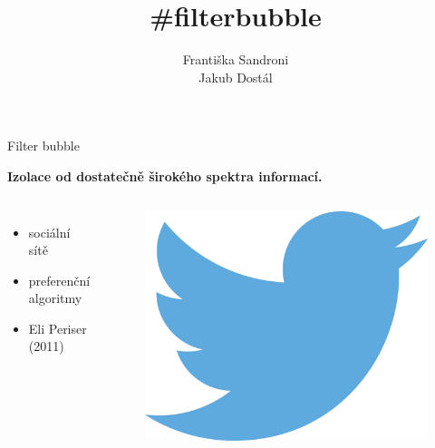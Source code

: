 \documentclass[notheorems,12pt]{beamer}
\title[]{\#filterbubble}
\date{}
\author{Františka Sandroni\\
        Jakub Dostál}
\institute{}
\begin{document}
\maketitle
\begin{frame}{Filter bubble}
    \center
    \vspace{-0.1cm}
    \begin{large}\textbf{Izolace od dostatečně širokého spektra informací.}\end{large}
    \vspace{0.8cm}
    \begin{columns}
    \column{5cm}
    \begin{itemize}
        \item sociální sítě
        \item preferenční algoritmy
        \item Eli Periser (2011)
    \end{itemize}
    \column{6cm}
        \begin{figure}
            \centering
            \includegraphics[scale=0.4]{./Pics/twitter.png}
        \end{figure}
    \end{columns}
\end{frame}
\end{document}
